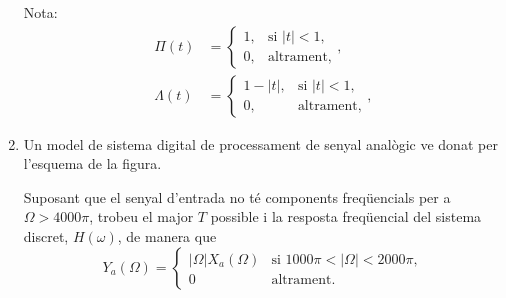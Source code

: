 \documentclass[a4paper,12pt]{article}
\def\figura#1{\begin{figure}[htbp]\centering\end{figure}\par}
\begin{document}
\begin{enumerate}
  Nota:
  \begin{align*}
  \Pi(t)&=\begin{cases}
    1, &\text{si $|t|<1$,}\\  0,&\text{altrament,} 
  \end{cases},\\
   \Lambda(t)&=\begin{cases}
    1-|t|, &\text{si $|t|<1$,}\\  0,&\text{altrament,} 
  \end{cases},
\end{align*}
\item Un model de sistema digital de processament de senyal analògic
  ve donat per l'esquema de la figura.
  \figura{probl3.exc8.pstex_t}
  Suposant que el senyal d'entrada no té components freqüencials per a
  $\Omega>4000\pi$, trobeu el major $T$ possible i la resposta
  freqüencial del sistema discret, $H(\omega)$, de manera que
  $$Y_a(\Omega)=
  \begin{cases}
    |\Omega|X_a(\Omega) & \text{si $1000\pi < | \Omega | < 2000\pi$}, \\
    0 & \text{altrament.}
  \end{cases}
  $$
\end{enumerate}
\end{document}
